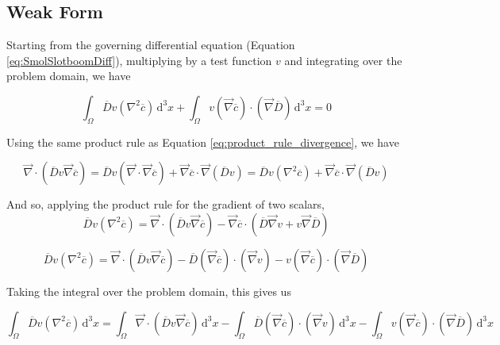 \subsection{Weak Form}\label{subsec:unhom_smol_weak}

Starting from the governing differential equation (Equation \ref{eq:SmolSlotboomDiff}),
multiplying by a test function $v$ and integrating over the problem domain, we have

\begin{equation}\label{eq:SmolWeakStart}
\int_{\Omega} \overline{D} v \left( \nabla^2 \overline{c} \right) \,\mathrm{d}^3x 
+ \int_{\Omega} v \left( \vec{\nabla} \overline{c} \right) \cdot \left( \vec{\nabla} \overline{D} \right) \,\mathrm{d}^3x = 0
\end{equation}

Using the same product rule as Equation \ref{eq:product_rule_divergence}, 
we have

\begin{equation}
\vec{\nabla} \cdot \left( \overline{D} v \vec{\nabla} \overline{c} \right) =
\overline{D} v \left(\vec{\nabla} \cdot \vec{\nabla} \overline{c} \right)
+ \vec{\nabla}\overline{c} \cdot \vec{\nabla} \left( \overline{D} v \right) =
\overline{D} v \left(\nabla^2 \overline{c} \right)
+ \vec{\nabla}\overline{c} \cdot \vec{\nabla} \left( \overline{D} v \right)
\end{equation}

And so, applying the product rule for the gradient of two scalars,
\begin{equation}
\overline{D} v \left(\nabla^2 \overline{c} \right) =
\vec{\nabla} \cdot \left( \overline{D} v \vec{\nabla} \overline{c} \right)
- \vec{\nabla}\overline{c} \cdot \left( \overline{D} \vec{\nabla} v + v \vec{\nabla} \overline{D} \right)
\end{equation}

\begin{equation}
\overline{D} v \left(\nabla^2 \overline{c} \right) =
\vec{\nabla} \cdot \left( \overline{D} v \vec{\nabla} \overline{c} \right)
- \overline{D} \left(\vec{\nabla}\overline{c}\right) \cdot \left(\vec{\nabla}v\right)
- v \left(\vec{\nabla}\overline{c}\right) \cdot \left(\vec{\nabla}\overline{D}\right)
\end{equation}

Taking the integral over the problem domain, this gives us

\begin{equation}
\int_{\Omega} \overline{D} v \left(\nabla^2 \overline{c} \right) \,\mathrm{d}^3x=
\int_{\Omega} \vec{\nabla} \cdot \left( \overline{D} v \vec{\nabla} \overline{c} \right) \,\mathrm{d}^3x
- \int_{\Omega} \overline{D} \left(\vec{\nabla}\overline{c}\right) \cdot \left(\vec{\nabla}v\right)\,\mathrm{d}^3x
- \int_{\Omega} v \left(\vec{\nabla}\overline{c}\right) \cdot \left(\vec{\nabla}\overline{D}\right) \,\mathrm{d}^3x
\end{equation}

